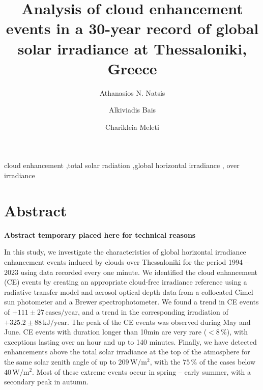 \documentclass[preprint, 5p,
authoryear]{elsarticle} %
\begin{document}
\begin{frontmatter}

  \title{Analysis of cloud enhancement events in a 30-year record of
global solar irradiance at Thessaloniki, Greece}
    \author[LAP]{Athanasios N. Natsis%
  }
    \author[LAP]{Alkiviadis Bais%
  }
    \author[LAP]{Charikleia Meleti%
  }
  
  \begin{abstract}
  
  \end{abstract}
    \begin{keyword}
    cloud enhancement \sep total solar radiation \sep global horizontal
irradiance \sep 
    over irradiance
  \end{keyword}
  
 \end{frontmatter}

\hypertarget{abstract}{%
\section*{Abstract}\label{abstract}}

\textbf{Abstract temporary placed here for technical reasons}

In this study, we investigate the characteristics of global horizontal
irradiance enhancement events induced by clouds over Thessaloniki for
the period 1994 -- 2023 using data recorded every one minute. We
identified the cloud enhancement (CE) events by creating an appropriate
cloud-free irradiance reference using a radiative transfer model and
aerosol optical depth data from a collocated Cimel sun photometer and a
Brewer spectrophotometer. We found a trend in CE events of
\(+111\pm 27\,\text{cases}/\text{year}\), and a trend in the
corresponding irradiation of \(+325.2\pm 88\,\text{kJ}/\text{year}\).
The peak of the CE events was observed during May and June. CE events
with duration longer than 10\nobreakspace{}min are very rare
(\(<8\,\%\)), with exceptions lasting over an hour and up to 140
minutes. Finally, we have detected enhancements above the total solar
irradiance at the top of the atmosphere for the same solar zenith angle
of up to \(209\,\text{W}/\text{m}^{2}\), with the \(75\,\%\) of the
cases below \(40\,\text{W}/\text{m}^{2}\). Most of these extreme events
occur in spring -- early summer, with a secondary peak in autumn.
\end{document}
